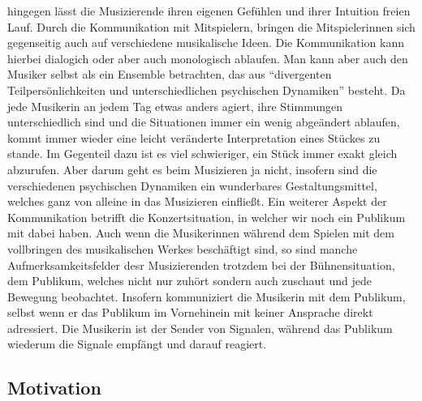 hingegen lässt die Musizierende ihren eigenen Gefühlen und ihrer Intuition
freien Lauf. Durch die Kommunikation mit Mitspielern, bringen die
Mitspielerinnen sich gegenseitig auch auf verschiedene musikalische Ideen. Die
Kommunikation kann hierbei dialogich oder aber auch monologisch ablaufen.
\autocite[61]{doerne:umfassend_musizieren} Man kann aber auch den Musiker selbst
als ein Ensemble betrachten, das aus \enquote{divergenten Teilpersönlichkeiten
und unterschiedlichen psychischen Dynamiken} besteht.
\autocite[64]{doerne:umfassend_musizieren} Da jede Musikerin an jedem Tag etwas
anders agiert, ihre Stimmungen unterschiedlich sind und die Situationen immer
ein wenig abgeändert ablaufen, kommt immer wieder eine leicht veränderte
Interpretation eines Stückes zu stande. Im Gegenteil dazu ist es viel
schwieriger, ein Stück immer exakt gleich abzurufen. Aber darum geht es beim
Musizieren ja nicht, insofern sind die verschiedenen psychischen Dynamiken ein
wunderbares Gestaltungsmittel, welches ganz von alleine in das Musizieren
einfließt. Ein weiterer Aspekt der Kommunikation betrifft die Konzertsituation,
in welcher wir noch ein Publikum mit dabei haben. Auch wenn die Musikerinnen während
dem Spielen mit dem vollbringen des musikalischen Werkes beschäftigt sind, so
sind manche Aufmerksamkeitsfelder desr Musizierenden trotzdem bei der
Bühnensituation, dem Publikum, welches nicht nur zuhört sondern auch zuschaut
und jede Bewegung beobachtet. Insofern kommuniziert die Musikerin mit dem
Publikum, selbst wenn er das Publikum im Vornehinein mit keiner Ansprache direkt
adressiert. Die Musikerin ist der Sender von Signalen, während das Publikum
wiederum die Signale empfängt und darauf reagiert. 



\subsection{Motivation}

